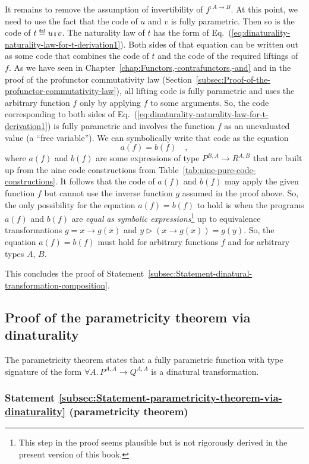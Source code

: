It remains to remove the assumption of invertibility of $f^{:A\rightarrow B}$.
At this point, we need to use the fact that the code of $u$ and $v$
is fully parametric. Then so is the code of $t\triangleq u\bef v$.
The naturality law of $t$ has the form of Eq.~(\ref{eq:dinaturality-naturality-law-for-t-derivation1}).
Both sides of that equation can be written out as some code that combines
the code of $t$ and the code of the required liftings of $f$. As
we have seen in Chapter~\ref{chap:Functors,-contrafunctors,-and}
and in the proof of the profunctor commutativity law (Section~\ref{subsec:Proof-of-the-profunctor-commutativity-law}),
all lifting code is fully parametric and uses the arbitrary function
$f$ only by applying $f$ to some arguments. So, the code corresponding
to both sides of Eq.~(\ref{eq:dinaturality-naturality-law-for-t-derivation1})
is fully parametric and involves the function $f$ as an unevaluated
value (a \textsf{``}free variable\textsf{''}). We can symbolically
write that code as the equation 
\[
a(f)=b(f)\quad,
\]
where $a(f)$ and $b(f)$ are some expressions of type $P^{B,A}\rightarrow R^{A,B}$
that are built up from the nine code constructions from Table~\ref{tab:nine-pure-code-constructions}.
It follows that the code of $a(f)$ and $b(f)$ may apply the given
function $f$ but cannot use the inverse function $g$ assumed in
the proof above. So, the only possibility for the equation $a(f)=b(f)$
to hold is when the programs $a(f)$ and $b(f)$ are \emph{equal}
\emph{as symbolic expressions}\footnote{This step in the proof seems plausible but is not rigorously derived
in the present version of this book.} up to equivalence transformations $g=x\rightarrow g(x)$ and $y\triangleright(x\rightarrow g(x))=g(y)$.
So, the equation $a(f)=b(f)$ must hold for arbitrary functions $f$
and for arbitrary types $A$, $B$. 

This concludes the proof of Statement~\ref{subsec:Statement-dinatural-transformation-composition}. 

\subsection{Proof of the parametricity theorem via dinaturality}

The parametricity theorem states that a fully parametric function
with type signature of the form $\forall A.\,P^{A,A}\rightarrow Q^{A,A}$
is a dinatural transformation. 

\subsubsection{Statement \label{subsec:Statement-parametricity-theorem-via-dinaturality}\ref{subsec:Statement-parametricity-theorem-via-dinaturality}
(parametricity theorem)}

